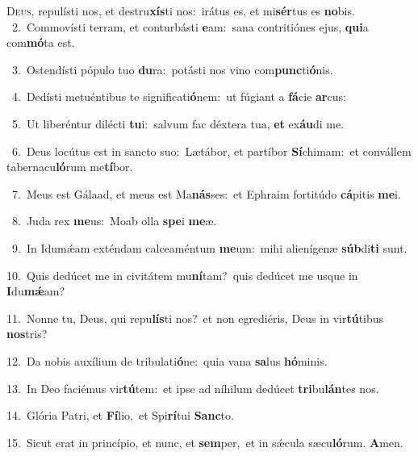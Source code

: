 \lettrine{\initial\textcolor{\initialcolor}{D}}{eus,} repulísti nos, et destru\-\textbf{xís}\-ti nos:~\star irátus es, et mi\-\textbf{sér}\-tus es \textbf{no}\-bis.\\
{\numbfont\textcolor{\numbcolor}{~2.}}~Commovísti terram, et conturbásti \textbf{e}\-am:~\star sana contritiónes ejus, \textbf{qui}\-a com\-\textbf{mó}\-ta est.\par
{\numbfont\textcolor{\numbcolor}{~3.}}~Ostendísti pópulo tuo \textbf{du}\-ra:~\star potásti nos vino com\-\textbf{punc}\-ti\-\textbf{ó}\-nis.\par
{\numbfont\textcolor{\numbcolor}{~4.}}~Dedísti metuéntibus te significati\-\textbf{ó}\-nem:~\star ut fúgiant a \textbf{fá}\-cie \textbf{ar}\-cus:\par
{\numbfont\textcolor{\numbcolor}{~5.}}~Ut liberéntur dilécti \textbf{tu}\-i:~\star salvum fac déxtera tua, \textbf{et} ex\-\textbf{áu}\-di me.\par
{\numbfont\textcolor{\numbcolor}{~6.}}~Deus locútus est in sancto suo:~\dagger Lætábor, et partíbor \textbf{Sí}\-chimam:~\star et convállem tabernacu\-\textbf{ló}\-rum me\-\textbf{tí}\-bor.\par
{\numbfont\textcolor{\numbcolor}{~7.}}~Meus est Gálaad, et meus est Ma\-\textbf{nás}\-ses:~\star et Ephraim fortitúdo \textbf{cá}\-pitis \textbf{me}\-i.\par
{\numbfont\textcolor{\numbcolor}{~8.}}~Juda rex \textbf{me}\-us:~\star Moab olla \textbf{spe}\-i \textbf{me}\-æ.\par
{\numbfont\textcolor{\numbcolor}{~9.}}~In Idumǽam exténdam calceaméntum \textbf{me}\-um:~\star mihi alienígenæ \textbf{súb}\-di\textbf{ti} sunt.\par
{\numbfont\textcolor{\numbcolor}{10.}}~Quis dedúcet me in civitátem mu\-\textbf{ní}\-tam?~\star quis dedúcet me usque in \textbf{I}\-du\-\textbf{mǽ}\-am?\par
{\numbfont\textcolor{\numbcolor}{11.}}~Nonne tu, Deus, qui repu\-\textbf{lís}\-ti nos?~\star et non egrediéris, Deus in vir\-\textbf{tú}\-tibus \textbf{nos}\-tris?\par
{\numbfont\textcolor{\numbcolor}{12.}}~Da nobis auxílium de tribulati\-\textbf{ó}\-ne:~\star quia vana \textbf{sa}\-lus \textbf{hó}\-minis.\par
{\numbfont\textcolor{\numbcolor}{13.}}~In Deo faciémus vir\-\textbf{tú}\-tem:~\star et ipse ad níhilum dedúcet \textbf{tri}\-bu\-\textbf{lán}\-tes nos.\par
{\numbfont\textcolor{\numbcolor}{14.}}~Glória Patri, et \textbf{Fí}\-lio,~\star et Spi\-\textbf{rí}\-tui \textbf{Sanc}\-to.\par
{\numbfont\textcolor{\numbcolor}{15.}}~Sicut erat in princípio, et nunc, et \textbf{sem}\-per,~\star et in sǽcula sæcu\-\textbf{ló}\-rum. \textbf{A}\-men.\par
